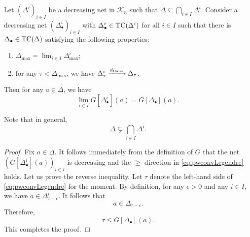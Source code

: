\begin{proposition}\label{prop:decnetLegend}
    Let $(\Delta^i)_{i\in I}$ be a decreasing net in $\mathcal{K}_n$ such that $\Delta\subseteq \bigcap_{i\in I}\Delta^i$. Consider a decreasing net $(\Delta^i_{\bullet})_{i\in I}$ with $\Delta^i_{\bullet}\in \mathrm{TC}(\Delta^i)$ for all $i\in I$ such that there is $\Delta_{\bullet}\in \mathrm{TC}(\Delta)$ satisfying the following properties:
    \begin{enumerate}
        \item\label{itm:prop:decnetLegend:1} $\Delta_{\max}= \lim_{i\in I}\Delta^i_{\max}$;
        \item\label{itm:prop:decnetLegend:2} for any $\tau<\Delta_{\max}$, we have $\Delta^i_{\tau}\xrightarrow{d_{\mathrm{Haus}}}\Delta_{\tau}$.
    \end{enumerate}
    Then for any $a\in \Delta$, we have
    \begin{equation}\label{eq:pwconvLegendre}
        \lim_{i\in I} G[\Delta^i_{\bullet}](a)=G[\Delta_{\bullet}](a).
    \end{equation}
\end{proposition}
Note that in general,
\[
\Delta\subsetneq \bigcap_{i\in I}\Delta^i.
\]
\begin{proof}
Fix $a\in \Delta$.
    It follows immediately from the definition of $G$ that the net $(G[\Delta^i_{\bullet}](a))_{i\in I}$ is decreasing and the $\geq$ direction in \eqref{eq:pwconvLegendre} holds. Let us prove the reverse inequality. Let $\tau$ denote the left-hand side of \eqref{eq:pwconvLegendre} for the moment. By definition, for any $\epsilon>0$ and any $i\in I$, we have $a\in \Delta^i_{\tau-\epsilon}$.
    It follows that
    \[
    a\in \Delta_{\tau-\epsilon}.
    \]
    Therefore,
    \[
    \tau\leq G[\Delta_{\bullet}](a).
    \]
    This completes the proof.
\end{proof}

